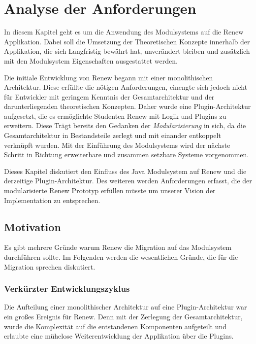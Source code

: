 \chapter{Analyse der Anforderungen}\label{cha:anforderungen}
In diesem Kapitel geht es um die Anwendung des Modulsystems auf die Renew Applikation. Dabei soll die Umsetzung der Theoretischen Konzepte innerhalb der Applikation, die sich Langfristig bewährt hat, unverändert bleiben und zusätzlich mit den Modulsystem Eigenschaften ausgestattet werden. \bigbreak


Die initiale Entwicklung von Renew begann mit einer monolithischen Architektur. Diese erfüllte die nötigen Anforderungen, einengte sich jedoch nicht für Entwickler mit geringem Kenntnis der Gesamtarchitektur und der darunterliegenden theoretischen Konzepten. Daher wurde eine Plugin-Architektur aufgesetzt, die es ermöglichte Studenten Renew mit Logik und Plugins zu erweitern. Diese Trägt bereits den Gedanken der \textit{Modularisierung} in sich, da die Gesamtarchitektur in Bestandsteile zerlegt und mit einander entkoppelt verknüpft wurden. Mit der Einführung des Modulsystems wird der nächste Schritt in Richtung erweiterbare und zusammen setzbare Systeme vorgenommen. \bigbreak


Dieses Kapitel diskutiert den Einfluss des Java Modulsystem auf Renew und die derzeitige Plugin-Architektur. Des weiteren werden Anforderungen erfasst, die der modularisierte Renew Prototyp erfüllen müsste um unserer Vision der Implementation zu entsprechen. 

\section{Motivation}\label{sec:motivation}
Es gibt mehrere Gründe warum Renew die Migration auf das Modulsystem durchführen sollte. Im Folgenden werden die wesentlichen Gründe, die für die Migration sprechen diskutiert.  

\subsection{Verkürzter Entwicklungszyklus}\label{sub:vez}
Die Aufteilung einer monolithischer Architektur auf eine Plugin-Architektur war ein großes Ereignis für Renew. Denn mit der Zerlegung der Gesamtarchitektur, wurde die Komplexität auf die entstandenen Komponenten aufgeteilt und erlaubte eine mühelose Weiterentwicklung der Applikation über die Plugins. \bigbreak


